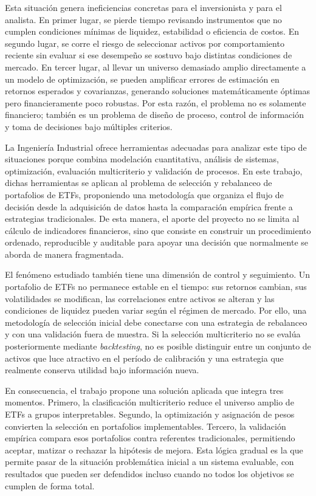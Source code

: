 \documentclass[12pt,letterpaper]{article}
\begin{document}
Esta situación genera ineficiencias concretas para el inversionista y para el analista. En primer lugar, se pierde tiempo revisando instrumentos que no cumplen condiciones mínimas de liquidez, estabilidad o eficiencia de costos. En segundo lugar, se corre el riesgo de seleccionar activos por comportamiento reciente sin evaluar si ese desempeño se sostuvo bajo distintas condiciones de mercado. En tercer lugar, al llevar un universo demasiado amplio directamente a un modelo de optimización, se pueden amplificar errores de estimación en retornos esperados y covarianzas, generando soluciones matemáticamente óptimas pero financieramente poco robustas. Por esta razón, el problema no es solamente financiero; también es un problema de diseño de proceso, control de información y toma de decisiones bajo múltiples criterios.

La Ingeniería Industrial ofrece herramientas adecuadas para analizar este tipo de situaciones porque combina modelación cuantitativa, análisis de sistemas, optimización, evaluación multicriterio y validación de procesos. En este trabajo, dichas herramientas se aplican al problema de selección y rebalanceo de portafolios de ETFs, proponiendo una metodología que organiza el flujo de decisión desde la adquisición de datos hasta la comparación empírica frente a estrategias tradicionales. De esta manera, el aporte del proyecto no se limita al cálculo de indicadores financieros, sino que consiste en construir un procedimiento ordenado, reproducible y auditable para apoyar una decisión que normalmente se aborda de manera fragmentada.

El fenómeno estudiado también tiene una dimensión de control y seguimiento. Un portafolio de ETFs no permanece estable en el tiempo: sus retornos cambian, sus volatilidades se modifican, las correlaciones entre activos se alteran y las condiciones de liquidez pueden variar según el régimen de mercado. Por ello, una metodología de selección inicial debe conectarse con una estrategia de rebalanceo y con una validación fuera de muestra. Si la selección multicriterio no se evalúa posteriormente mediante \textit{backtesting}, no es posible distinguir entre un conjunto de activos que luce atractivo en el período de calibración y una estrategia que realmente conserva utilidad bajo información nueva.

En consecuencia, el trabajo propone una solución aplicada que integra tres momentos. Primero, la clasificación multicriterio reduce el universo amplio de ETFs a grupos interpretables. Segundo, la optimización y asignación de pesos convierten la selección en portafolios implementables. Tercero, la validación empírica compara esos portafolios contra referentes tradicionales, permitiendo aceptar, matizar o rechazar la hipótesis de mejora. Esta lógica gradual es la que permite pasar de la situación problemática inicial a un sistema evaluable, con resultados que pueden ser defendidos incluso cuando no todos los objetivos se cumplen de forma total.
\end{document}
